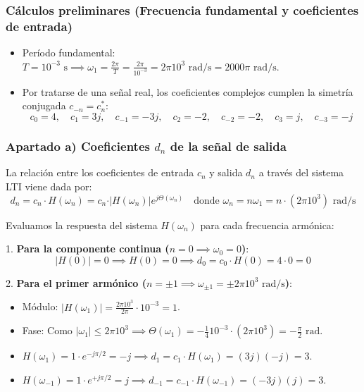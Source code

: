 \begin{resolucion}
\subsubsection*{Cálculos preliminares (Frecuencia fundamental y coeficientes de entrada)}

\begin{itemize}
    \item Período fundamental: $T = 10^{-3}\text{ s} \implies \omega_1 = \frac{2\pi}{T} = \frac{2\pi}{10^{-3}} = 2\pi 10^3\text{ rad/s} = 2000\pi\text{ rad/s}$.
    \item Por tratarse de una señal real, los coeficientes complejos cumplen la simetría conjugada $c_{-n} = c_n^*$:
      \[c_0 = 4, \quad c_1 = 3j, \quad c_{-1} = -3j, \quad c_2 = -2, \quad c_{-2} = -2, \quad c_3 = j, \quad c_{-3} = -j\]
\end{itemize}

\subsubsection*{Apartado a) Coeficientes $d_n$ de la señal de salida}

La relación entre los coeficientes de entrada $c_n$ y salida $d_n$ a través del sistema LTI viene dada por:
\[d_n = c_n \cdot H(\omega_n) = c_n \cdot \vert{}H(\omega_n)\vert{} e^{j \Theta(\omega_n)} \quad \text{donde } \omega_n = n \omega_1 = n \cdot (2\pi 10^3)\text{ rad/s}\]

Evaluamos la respuesta del sistema $H(\omega_n)$ para cada frecuencia armónica:

1. \textbf{Para la componente continua ($n = 0 \implies \omega_0 = 0$)}:
   \[\vert{}H(0)\vert{} = 0 \implies H(0) = 0 \implies d_0 = c_0 \cdot H(0) = 4 \cdot 0 = 0\]

2. \textbf{Para el primer armónico ($n = \pm 1 \implies \omega_{\pm 1} = \pm 2\pi 10^3\text{ rad/s}$)}:
   \begin{itemize}
       \item Módulo: $\vert{}H(\omega_1)\vert{} = \frac{2\pi 10^3}{2\pi} \cdot 10^{-3} = 1$.
       \item Fase: Como $\vert{}\omega_1\vert{} \le 2\pi 10^3 \implies \Theta(\omega_1) = -\frac{1}{4} 10^{-3} \cdot (2\pi 10^3) = -\frac{\pi}{2}\text{ rad}$.
       \item $H(\omega_1) = 1 \cdot e^{-j\pi/2} = -j \implies d_1 = c_1 \cdot H(\omega_1) = (3j)(-j) = 3$.
       \item $H(\omega_{-1}) = 1 \cdot e^{+j\pi/2} = j \implies d_{-1} = c_{-1} \cdot H(\omega_{-1}) = (-3j)(j) = 3$.
   \end{itemize}


\end{resolucion}
